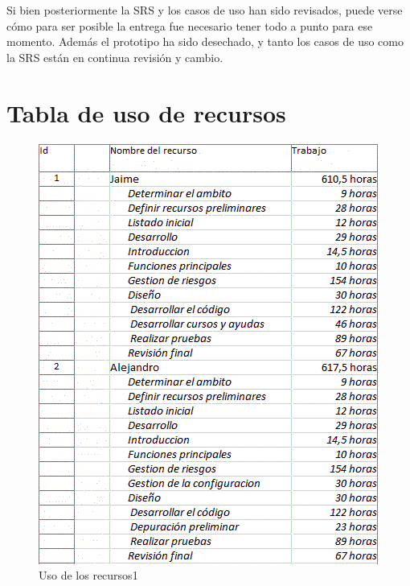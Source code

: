 \documentclass[spanish,a4paper,12pt]{report}	%
\begin{document}
	 Si bien posteriormente la SRS y los casos de uso han sido revisados, puede verse cómo para ser posible la entrega fue necesario tener todo a punto para ese momento.
	Además el prototipo ha sido desechado, y tanto los casos de uso como la SRS están en continua revisión y cambio.

	\newpage

	\section{Tabla de uso de recursos}

	\begin{figure}[!h]
	\centering
	\includegraphics[scale=0.8]{UsoRecursos1.png}
	\caption{Uso de los recursos1}
	\end{figure}
\end{document}
